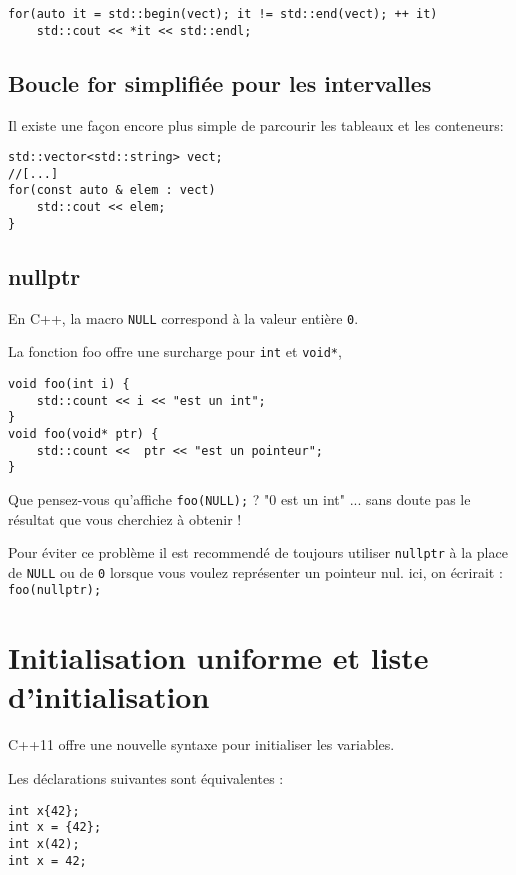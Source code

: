 \documentclass[9pt]{article}
\begin{document}
\begin{lstlisting}
for(auto it = std::begin(vect); it != std::end(vect); ++ it)
	std::cout << *it << std::endl;
\end{lstlisting}
		
\subsection*{Boucle for simplifiée pour les intervalles}
Il existe une façon encore plus simple de parcourir les tableaux et les conteneurs:

\begin{lstlisting}
std::vector<std::string> vect;
//[...]
for(const auto & elem : vect)
	std::cout << elem;
}
\end{lstlisting}
      
\subsection*{nullptr}     

En C++, la macro \lstinline{NULL} correspond à la valeur entière \lstinline{0}.

La fonction foo offre une surcharge pour \lstinline{int} et \lstinline{void*},
\begin{lstlisting}
void foo(int i) {
	std::count << i << "est un int";
}
void foo(void* ptr) {
	std::count <<  ptr << "est un pointeur";
}
\end{lstlisting}

Que pensez-vous qu'affiche \lstinline{foo(NULL);} ? "0 est un int" ... sans doute pas le résultat que vous cherchiez à obtenir !

Pour éviter ce problème il est recommendé de toujours utiliser \lstinline{nullptr} à la place de \lstinline{NULL} ou de \lstinline{0} lorsque vous voulez représenter un pointeur nul.  ici, on écrirait : \lstinline{foo(nullptr);}


\section*{Initialisation uniforme et liste d'initialisation}

C++11 offre une nouvelle syntaxe pour initialiser les variables.

Les déclarations suivantes sont équivalentes :
\begin{lstlisting}
int x{42};
int x = {42};
int x(42);
int x = 42;
\end{lstlisting}
\end{document}
